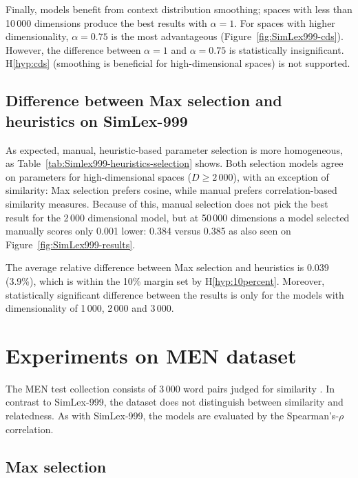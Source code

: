 Finally, models benefit from context distribution smoothing; spaces with less than 10\,000 dimensions produce the best results with $\alpha = 1$. For spaces with higher dimensionality, $\alpha = 0.75$ is the most advantageous (Figure~\ref{fig:SimLex999-cds}). However, the difference between $\alpha = 1$ and $\alpha = 0.75$ is statistically insignificant. H\ref{hyp:cds} (smoothing is beneficial for high-dimensional spaces) is not supported.

\subsection{Difference between Max selection and heuristics on SimLex-999}

As expected, manual, heuristic-based parameter selection is more homogeneous, as Table~\ref{tab:Simlex999-heuristics-selection} shows. Both selection models agree on parameters for high-dimensional spaces ($D \geq 2\,000$), with an exception of similarity: Max selection prefers cosine, while manual prefers correlation-based similarity measures. Because of this, manual selection does not pick the best result for the 2\,000 dimensional model, but at 50\,000 dimensions a model selected manually scores only 0.001 lower: 0.384 versus 0.385 as also seen on Figure~\ref{fig:SimLex999-results}.

The average relative difference between Max selection and heuristics is 0.039 (3.9\%), which is within the 10\% margin set by H\ref{hyp:10percent}. Moreover, statistically significant difference between the results is only for the models with dimensionality of 1\,000, 2\,000 and 3\,000.

\section{Experiments on MEN dataset}
\label{sec:men}



The MEN test collection consists of 3\,000 word pairs judged for similarity \cite{Bruni:2014:MDS:2655713.2655714}. In contrast to SimLex-999, the dataset does not distinguish between similarity and relatedness. As with SimLex-999, the models are evaluated by the Spearman's-$\rho$ correlation.

\subsection{Max selection}
\label{sec:max-selection-men}

